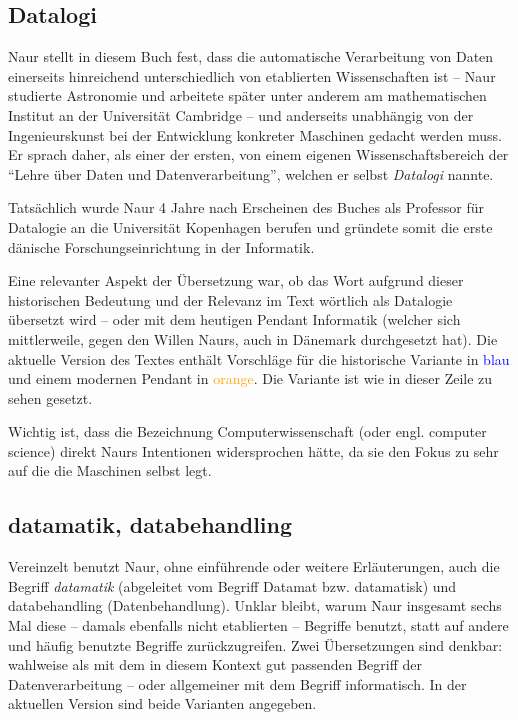 \subsection{Datalogi}

    Naur stellt in diesem Buch fest, dass die automatische Verarbeitung von Daten einerseits hinreichend unterschiedlich von etablierten Wissenschaften ist -- Naur studierte Astronomie und arbeitete später unter anderem am mathematischen Institut an der Universität Cambridge -- und anderseits unabhängig von der Ingenieurskunst bei der Entwicklung konkreter Maschinen gedacht werden muss. Er sprach daher, als einer der ersten, von einem eigenen Wissenschaftsbereich der \enquote{Lehre über Daten und Datenverarbeitung}, welchen er selbst \emph{Datalogi} nannte.

    Tatsächlich wurde Naur 4 Jahre nach Erscheinen des Buches als Professor für Datalogie an die Universität Kopenhagen berufen und gründete somit die erste dänische Forschungseinrichtung in der Informatik.
    
    Eine relevanter Aspekt der Übersetzung war, ob das Wort  aufgrund dieser historischen Bedeutung und der Relevanz im Text wörtlich als Datalogie übersetzt wird -- oder mit dem heutigen Pendant Informatik (welcher sich mittlerweile, gegen den Willen Naurs, auch in Dänemark durchgesetzt hat). Die aktuelle Version des Textes enthält Vorschläge für die historische Variante in \textcolor{blue}{blau} und einem modernen Pendant in \textcolor{orange}{orange}. Die  Variante ist wie in dieser Zeile zu sehen gesetzt. 
    
    Wichtig ist, dass die Bezeichnung Computerwissenschaft (oder engl. computer science) direkt Naurs Intentionen widersprochen hätte, da sie den Fokus zu sehr auf die die Maschinen selbst legt. 

\subsection{datamatik, databehandling}

    Vereinzelt benutzt Naur, ohne einführende oder weitere Erläuterungen, auch die Begriff \emph{datamatik} (abgeleitet vom Begriff Datamat bzw. datamatisk) und databehandling (Datenbehandlung). Unklar bleibt, warum Naur insgesamt sechs Mal diese -- damals ebenfalls nicht etablierten -- Begriffe benutzt, statt auf andere und häufig benutzte Begriffe zurückzugreifen. Zwei Übersetzungen sind denkbar: wahlweise als mit dem in diesem Kontext gut passenden Begriff der Datenverarbeitung -- oder allgemeiner mit dem Begriff informatisch. In der aktuellen Version sind beide Varianten angegeben.       

